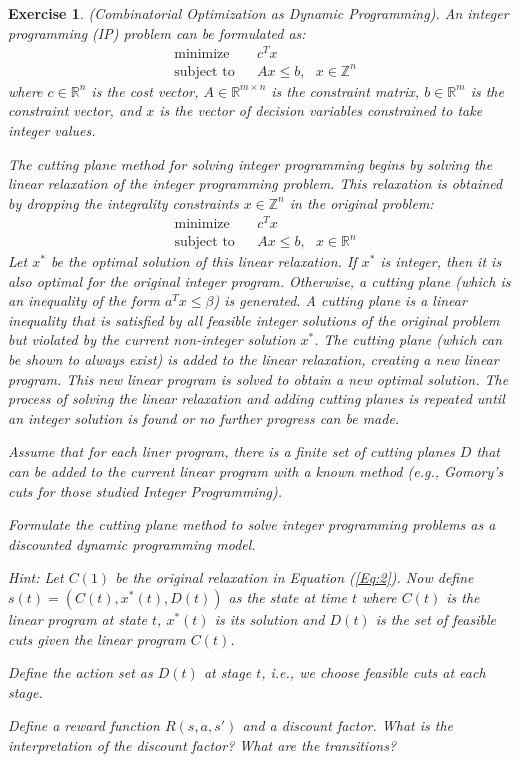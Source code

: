 \documentclass[letter,11pt]{article}
\newtheorem{exercise}{Exercise}[section]
\begin{document}
\begin{exercise} (Combinatorial Optimization as Dynamic Programming). 
An integer programming (IP) problem can be formulated as:
\begin{equation}
\begin{aligned}
& \text{minimize} & & c^T x \\
& \text{subject to} & & Ax \leq b, \text{ }  x \in \mathbb{Z}^n 
\end{aligned}
\end{equation}
where \( c \in \mathbb{R}^n \) is the cost vector, \( A \in \mathbb{R}^{m \times n} \) is the constraint matrix, \( b \in \mathbb{R}^m \) is the constraint vector, and \( x \) is the vector of decision variables constrained to take integer values.


The cutting plane method for solving integer programming begins by solving the linear relaxation of the integer programming problem. This relaxation is obtained by dropping the integrality constraints \( x \in \mathbb{Z}^n \) in the original problem:
\begin{equation} \label{Eq:2}
\begin{aligned}
& \text{minimize} & & c^T x  \\
& \text{subject to} & & Ax \leq b, \text{ } x \in \mathbb{R}^n 
\end{aligned}
\end{equation}
Let \( x^* \) be the optimal solution of this linear relaxation. If \( x^* \) is integer, then it is also optimal for the original integer program. Otherwise, a cutting plane (which is an inequality of the form $a^{T}x \leq \beta$) is generated. A cutting plane is a linear inequality that is satisfied by all feasible integer solutions of the original problem but violated by the current non-integer solution \( x^* \). The cutting plane (which can be shown to always exist) is added to the linear relaxation, creating a new linear program. This new linear program is solved to obtain a new optimal solution. The process of solving the linear relaxation and adding cutting planes is repeated until an integer solution is found or no further progress can be made. 

Assume that for each liner program, there is a finite set of cutting planes $D$ that can be added to the current linear program with a known method (e.g., Gomory’s  cuts for those studied Integer Programming). 

Formulate the cutting plane method to solve integer programming problems as a discounted dynamic programming model. 

Hint: Let $C(1)$ be the original relaxation in Equation (\ref{Eq:2}). Now define $s(t) = (C(t),x^{*}(t), D(t))$ as the state at time $t$ where $C(t)$ is the linear program at state $t$, $x^{*}(t)$ is its solution and $D(t)$ is the set of feasible cuts given the linear program $C(t)$. 

Define the action set as $D(t)$ at stage $t$, i.e., we choose feasible cuts at each stage. 

Define a reward function $R(s,a,s')$ and a discount factor. What is the interpretation of the discount factor? 
What are the transitions?
\end{exercise}
\end{document}
